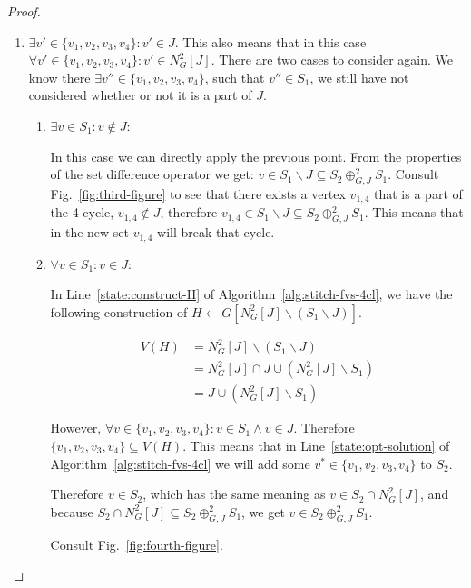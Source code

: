 \begin{proof}
\begin{enumerate}
    \item $\exists v' \in \{v_1,v_2,v_3,v_4\}: v' \in J$. This also means that in this case 
    $\forall v' \in \{v_1,v_2,v_3,v_4\}: v' \in N^{2}_{G}[J]$.
    There are two cases to consider again. We know there $\exists v'' \in \{v_1,v_2,v_3,v_4\}$, 
    such that $v'' \in S_1$, we still have not considered whether or not it is a part of $J$.

    \begin{enumerate}
        \item $\exists v \in S_1: v \notin J$:
        
        In this case we can directly apply the previous point. From the properties of the set 
        difference operator we get: $v \in S_1 \backslash J \subseteq S_2 \oplus^{2}_{G,J} S_1$. 
        Consult Fig.~\ref{fig:third-figure} to see that there exists a vertex $v_{1,4}$ that is a part of 
        the 4-cycle, $v_{1,4} \notin J$, therefore $v_{1,4} \in S_1 \backslash J \subseteq S_2 \oplus^{2}_{G,J} S_1$.
        This means that in the new set $v_{1,4}$ will break that cycle.

        \item $\forall v \in S_1: v \in J$:

        In Line~\ref{state:construct-H} of Algorithm~\ref{alg:stitch-fvs-4cl}, we have the following 
        construction of $H \leftarrow G[N^{2}_{G}[J] \backslash (S_1 \backslash J)]$. 

        \begin{align}
            V(H) &= N^{2}_{G}[J] \backslash (S_1 \backslash J) \\
                 &= N^{2}_{G}[J] \cap J \cup (N^{2}_G[J] \backslash S_1) \\
                 &= J \cup (N^{2}_G[J] \backslash S_1)
        \end{align}

        However, $\forall v \in \{v_1,v_2,v_3,v_4\}: v \in S_1 \land v \in J$. 
        Therefore $\{v_1,v_2,v_3,v_4\} \subseteq V(H)$. This means that in Line~\ref{state:opt-solution} of 
        Algorithm~\ref{alg:stitch-fvs-4cl} we will add some $v^{*} \in \{v_1,v_2,v_3,v_4\}$ to $S_2$.

        Therefore $v \in S_2$, which has the same meaning as $v \in S_2 \cap N^{2}_{G}[J]$,
        and because $S_2 \cap N^{2}_{G}[J] \subseteq S_2 \oplus^{2}_{G,J} S_1$, we get 
        $v \in S_2 \oplus^{2}_{G,J} S_1$.

        Consult Fig.~\ref{fig:fourth-figure}. 


\end{enumerate}
\end{enumerate}
\end{proof}
